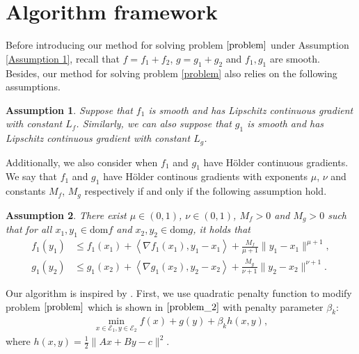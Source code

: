 \documentclass{article}
\numberwithin{equation}{section}
\newtheorem{assumption}{Assumption}[section]
\begin{document}
\section{Algorithm framework }\label{section_convergence_Lipschitz} 
Before introducing our method for solving problem $\eqref{problem}$ under Assumption \ref{Assumption 1}, recall that $f=f_1 + f_2$, 
$g=g_1+g_2$ and  $f_1,g_1$ are smooth. 
Besides, our method for solving problem \eqref{problem} also relies on the following assumptions. 
\begin{assumption} \label{Assumption_Lipschitz_continuity}
    Suppose that $f_1$ is smooth and has Lipschitz continuous gradient with constant $L_f$. Similarly, 
    we can also suppose that $g_1$ is smooth and has Lipschitz continuous gradient with constant $L_g$.
\end{assumption}
Additionally,  we also consider when $f_1$ and $g_1$ have H\"older continuous gradients. We say that $f_1$ and 
$g_1$ have H\"older continous gradients with exponents $\mu$, $\nu$ and constants $M_f$, $M_g$ respectively if and only if the following assumption hold.
\begin{assumption} \label{Assumption_holder}
   There exist $\mu \in (0,1)$, $\nu\in (0,1)$, $M_f>0$ and $M_g>0$ such that for all $x_1,y_1 \in \mathrm{dom}f$ and 
   $x_2,y_2\in \mathrm{dom}g$, it holds that 
    \begin{align}
        f_1(y_1) &\leq f_1(x_1) + \left\langle \nabla f_1(x_1), y_1-x_1 \right\rangle +\frac{M_f}{\mu +1}
        \|y_1-x_1\rVert^{\mu +1}, \nonumber\\
        g_1(y_2) & \leq g_1(x_2) + \left\langle \nabla g_1(x_2), y_2-x_2 \right\rangle +\frac{M_g}{\nu+1}
        \|y_2-x_2\rVert^{\nu+1}. \label{Holder_property}
    \end{align}
\end{assumption}

Our algorithm is inspired by \cite{yu2020rc}. First, we use quadratic 
penalty function to modify  problem $\eqref{problem}$ which is shown in $\eqref{problem_2}$ 
with penalty parameter $\beta_k$:
\begin{align}
    \min\limits_{x\in \mathcal{E}_1,y \in \mathcal{E}_2} f(x) + g(y) + \beta_k h(x,y),  
    \label{problem_2}
\end{align}
where $h(x,y) = \frac{1}{2}\|Ax+ By-c \rVert^2$.
\end{document}

